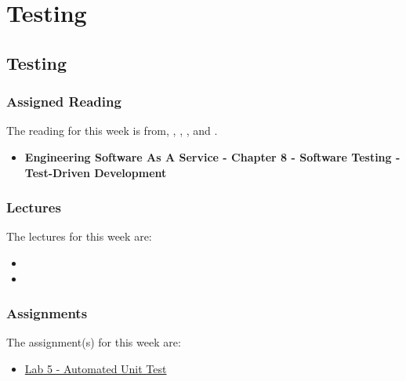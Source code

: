 \clearpage

\renewcommand{\ChapTitle}{Testing}
\renewcommand{\SectionTitle}{Testing}

\chapter{\ChapTitle}

\section{\SectionTitle}

\subsection{Assigned Reading}

The reading for this week is from, \AgileBook, \EngSoftBook, \ProGitBook, and \LinuxBook.

\begin{itemize}
    \item \textbf{Engineering Software As A Service - Chapter 8 - Software Testing - Test-Driven Development}
\end{itemize}

\subsection{Lectures}

The lectures for this week are:

\begin{itemize}
    \item {}
    \item {}
\end{itemize}

\subsection{Assignments}

The assignment(s) for this week are:

\begin{itemize}
    \item \href{https://github.com/cu-cspb-3308-software-dev-summer-2024/lab-5-QuantumCompiler}{Lab 5 - Automated Unit Test}
\end{itemize}

